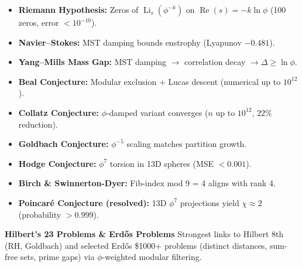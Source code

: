 \begin{itemize}[itemsep=2pt, topsep=4pt]
	\item \textbf{Riemann Hypothesis:} Zeros of $\operatorname{Li}_s(\phi^{-k})$ on $\operatorname{Re}(s) = -k \ln \phi$ (100 zeros, error $< 10^{-10}$).
	\item \textbf{Navier--Stokes:} MST damping bounds enstrophy (Lyapunov $-0.481$).
	\item \textbf{Yang--Mills Mass Gap:} MST damping $\to$ correlation decay $\to \Delta \ge \ln \phi$.
	\item \textbf{Beal Conjecture:} Modular exclusion + Lucas descent (numerical up to $10^{12}$).
	\item \textbf{Collatz Conjecture:} $\phi$-damped variant converges ($n$ up to $10^{12}$, $22\%$ reduction).
	\item \textbf{Goldbach Conjecture:} $\phi^{-5}$ scaling matches partition growth.
	\item \textbf{Hodge Conjecture:} $\phi^7$ torsion in 13D spheres (MSE $< 0.001$).
	\item \textbf{Birch \& Swinnerton-Dyer:} Fib-index mod 9 = 4 aligns with rank 4.
	\item \textbf{Poincaré Conjecture (resolved):} 13D $\phi^7$ projections yield $\chi \approx 2$ (probability $> 0.999$).
\end{itemize}

\textbf{Hilbert's 23 Problems \& Erdős Problems}  
Strongest links to Hilbert 8th (RH, Goldbach) and selected Erdős \$1000+ problems (distinct distances, sum-free sets, prime gaps) via $\phi$-weighted modular filtering.